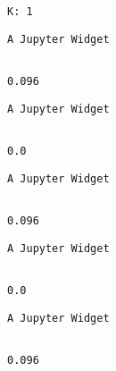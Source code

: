 \documentclass[11pt]{article}
\begin{document}
    \begin{Verbatim}[commandchars=\\\{\}]
K: 1

    \end{Verbatim}

    
    \begin{verbatim}
A Jupyter Widget
    \end{verbatim}

    
    \begin{Verbatim}[commandchars=\\\{\}]

0.096

    \end{Verbatim}

    
    \begin{verbatim}
A Jupyter Widget
    \end{verbatim}

    
    \begin{Verbatim}[commandchars=\\\{\}]

0.0

    \end{Verbatim}

    
    \begin{verbatim}
A Jupyter Widget
    \end{verbatim}

    
    \begin{Verbatim}[commandchars=\\\{\}]

0.096

    \end{Verbatim}

    
    \begin{verbatim}
A Jupyter Widget
    \end{verbatim}

    
    \begin{Verbatim}[commandchars=\\\{\}]

0.0

    \end{Verbatim}

    
    \begin{verbatim}
A Jupyter Widget
    \end{verbatim}

    
    \begin{Verbatim}[commandchars=\\\{\}]

0.096

    \end{Verbatim}
\end{document}
